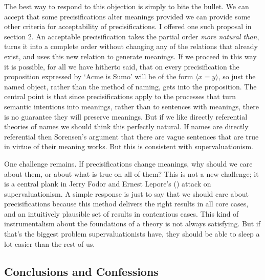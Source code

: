 \documentclass[
  11pt,
  letterpaper,
  DIV=11,
  numbers=noendperiod,
  oneside]{scrartcl}
\begin{document}
The best way to respond to this objection is simply to bite the bullet.
We can accept that some precisifications alter meanings provided we can
provide some other criteria for acceptability of precisifications. I
offered one such proposal in section 2. An acceptable precisification
takes the partial order \emph{more natural than}, turns it into a
complete order without changing any of the relations that already exist,
and uses this new relation to generate meanings. If we proceed in this
way it is possible, for all we have hitherto said, that on every
precisification the proposition expressed by `Acme is Sumo' will be of
the form \(\langle x = y \rangle\), so just the named object, rather
than the method of naming, gets into the proposition. The central point
is that since precisifications apply to the processes that turn semantic
intentions into meanings, rather than to sentences with meanings, there
is no guarantee they will preserve meanings. But if we like directly
referential theories of names we should think this perfectly natural. If
names are directly referential then Sorensen's argument that there are
vague sentences that are true in virtue of their meaning works. But this
is consistent with supervaluationism.

One challenge remains. If precisifications change meanings, why should
we care about them, or about what is true on all of them? This is not a
new challenge; it is a central plank in Jerry Fodor and Ernest Lepore's
() attack on supervaluationism. A simple
response is just to say that we should care about precisifications
because this method delivers the right results in all core cases, and an
intuitively plausible set of results in contentious cases. This kind of
instrumentalism about the foundations of a theory is not always
satisfying. But if that's the
biggest problem supervaluationists have, they should be able to sleep a
lot easier than the rest of us.

\subsection{Conclusions and
Confessions}\label{conclusions-and-confessions}
\end{document}
